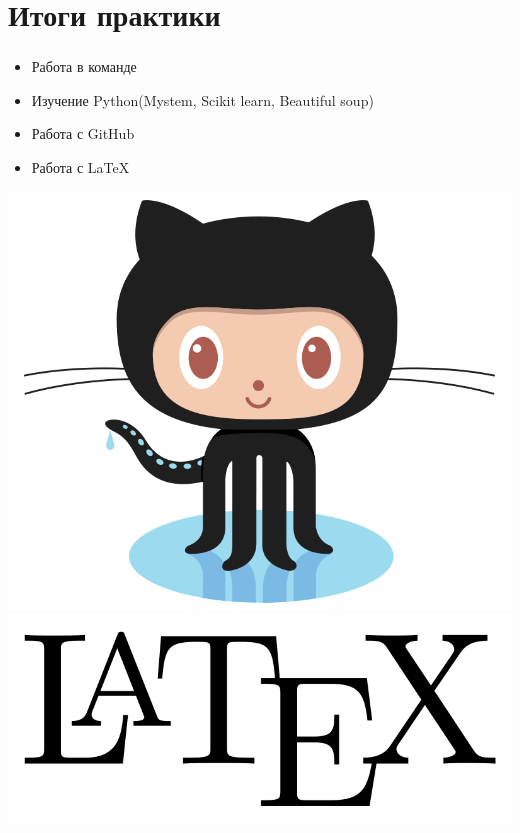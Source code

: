 \documentclass[t]{beamer}
\begin{document}
	
	\section{Итоги практики}
	
	
	\begin{frame}
		\frametitle{\insertsection}
		\begin{itemize}
			\item{Работа в команде}
			\item{Изучение Python(Mystem, Scikit learn, Beautiful soup)}
			\item{Работа с GitHub}
			\item{Работа с \LaTeX}
		\end{itemize}
		\includegraphics[scale = 0.08]{images/git_hub.png}
		\includegraphics[scale = 0.08]{images/latex-logo.png}

\end{frame}
\end{document}
